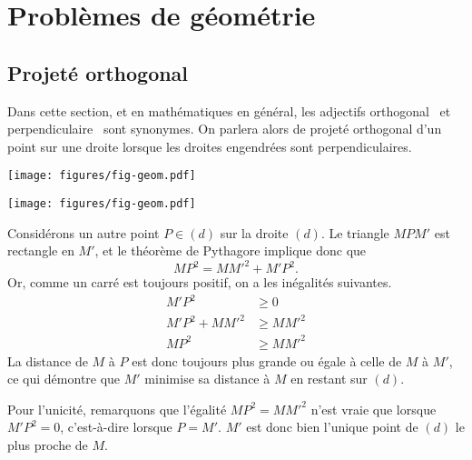 
\chapter{Problèmes de géométrie}
\label{chap:pb-geom}

\section{Projeté orthogonal}

	Dans cette section, et en mathématiques en général, les adjectifs \og orthogonal \fg \, et \og perpendiculaire \fg \, sont synonymes.
	On parlera alors de projeté orthogonal d'un point sur une droite lorsque les droites engendrées sont perpendiculaires.


	\begin{center}
	\texttt{[image: figures/fig-geom.pdf]}
	\end{center}




	\begin{center}
	\texttt{[image: figures/fig-geom.pdf]}
	\end{center}

\pf%
{}{
	Considérons un autre point $P \in (d)$ sur la droite $(d)$.
	Le triangle $MPM'$ est rectangle en $M'$, et le théorème de Pythagore implique donc que
		\[ MP^2 = MM'^2 + M'P^2. \]
	Or, comme un carré est toujours positif, on a les inégalités suivantes.
		\begin{align*}
			M'P^2 &\geq 0 \\
			M'P^2 + MM'^2 &\geq MM'^2 \\
			MP^2 &\geq MM'^2
		\end{align*}
	La distance de $M$ à $P$ est donc toujours plus grande ou égale à celle de $M$ à $M'$, ce qui démontre que $M'$ minimise sa distance à $M$ en restant sur $(d)$.
	
	Pour l'unicité, remarquons que l'égalité $MP^2 = MM'^2$ n'est vraie que lorsque $M'P^2 = 0$, c'est-à-dire lorsque $P=M'$. 
	$M'$ est donc bien l'unique point de $(d)$ le plus proche de $M$.
}

